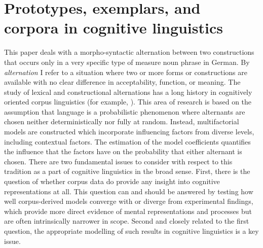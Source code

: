 \section{Prototypes, exemplars, and corpora in cognitive linguistics}
\label{sec:cogocl}

This paper deals with a morpho-syntactic alternation between two constructions that occurs only in a very specific type of measure noun phrase in German.
By \textit{alternation} I refer to a situation where two or more forms or constructions are available with no clear difference in acceptability, function, or meaning.
The study of lexical and constructional alternations has a long history in cognitively oriented corpus linguistics (for example, \citealp{BresnanEa2007,BresnanHay2010,BresnanFord2010,DivjakArppe2013,Gries2015,NessetJanda2010,Wulff2003}).
This area of research is based on the assumption that language is a probabilistic phenomenon \citep{Bresnan2007} where alternants are chosen neither deterministically nor fully at random.
Instead, multifactorial models are constructed which incorporate influencing factors from diverse levels, including contextual factors.
The estimation of the model coefficients quantifies the influence that the factors have on the probability that either alternant is chosen.
There are two fundamental issues to consider with respect to this tradition as a part of cognitive linguistics in the broad sense.
First, there is the question of whether corpus data do provide any insight into cognitive representations at all.
This question can and should be answered by testing how well corpus-derived models converge with or diverge from experimental findings, which provide more direct evidence of mental representations and processes but are often intrinsically narrower in scope.
Second and closely related to the first question, the appropriate modelling of such results in cognitive linguistics is a key issue.

